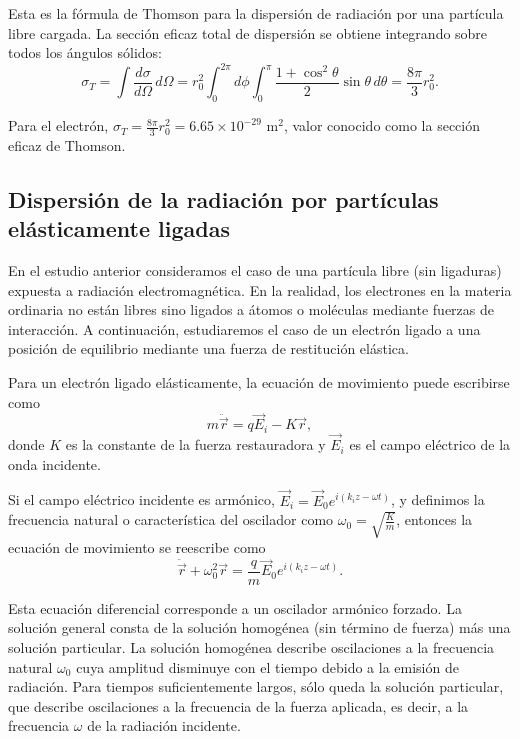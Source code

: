 \documentclass[12pt,a4paper]{book}
\begin{document}
Esta es la fórmula de Thomson para la dispersión de radiación por una partícula libre cargada. La sección eficaz total de dispersión se obtiene integrando sobre todos los ángulos sólidos:
\begin{equation}
\sigma_T = \int\frac{d\sigma}{d\Omega}\,d\Omega = r_0^2\int_0^{2\pi}d\phi\int_0^{\pi}\frac{1 + \cos^2\theta}{2}\sin\theta\,d\theta = \frac{8\pi}{3}r_0^2.
\end{equation}

Para el electrón, $\sigma_T = \frac{8\pi}{3}r_0^2 = 6.65 \times 10^{-29}$ m$^2$, valor conocido como la sección eficaz de Thomson.

\subsection{Dispersión de la radiación por partículas elásticamente ligadas}

En el estudio anterior consideramos el caso de una partícula libre (sin ligaduras) expuesta a radiación electromagnética. En la realidad, los electrones en la materia ordinaria no están libres sino ligados a átomos o moléculas mediante fuerzas de interacción. A continuación, estudiaremos el caso de un electrón ligado a una posición de equilibrio mediante una fuerza de restitución elástica.

Para un electrón ligado elásticamente, la ecuación de movimiento puede escribirse como
\begin{equation}
m\ddot{\vec{r}} = q\vec{E}_i - K\vec{r},
\end{equation}
donde $K$ es la constante de la fuerza restauradora y $\vec{E}_i$ es el campo eléctrico de la onda incidente.

Si el campo eléctrico incidente es armónico, $\vec{E}_i = \vec{E}_0e^{i(k_iz-\omega t)}$, y definimos la frecuencia natural o característica del oscilador como $\omega_0 = \sqrt{\frac{K}{m}}$, entonces la ecuación de movimiento se reescribe como
\begin{equation}
\ddot{\vec{r}} + \omega_0^2\vec{r} = \frac{q}{m}\vec{E}_0e^{i(k_iz-\omega t)}.
\end{equation}

Esta ecuación diferencial corresponde a un oscilador armónico forzado. La solución general consta de la solución homogénea (sin término de fuerza) más una solución particular. La solución homogénea describe oscilaciones a la frecuencia natural $\omega_0$ cuya amplitud disminuye con el tiempo debido a la emisión de radiación. Para tiempos suficientemente largos, sólo queda la solución particular, que describe oscilaciones a la frecuencia de la fuerza aplicada, es decir, a la frecuencia $\omega$ de la radiación incidente.
\end{document}
